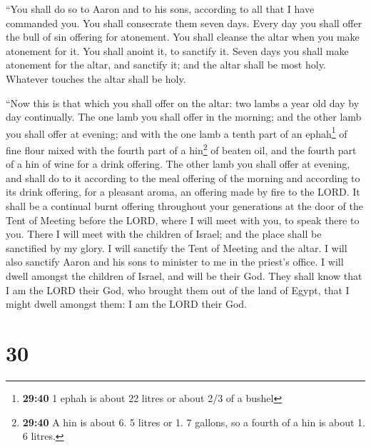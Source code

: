  ``You shall do so to Aaron and to his sons, according to
all that I have commanded you. You shall consecrate them seven days.
 Every day you shall offer the bull of sin offering for
atonement. You shall cleanse the altar when you make atonement for it.
You shall anoint it, to sanctify it.  Seven days you
shall make atonement for the altar, and sanctify it; and the altar shall
be most holy. Whatever touches the altar shall be holy.

 ``Now this is that which you shall offer on the altar:
two lambs a year old day by day continually.  The one
lamb you shall offer in the morning; and the other lamb you shall offer
at evening;  and with the one lamb a tenth part of an
ephah\footnote{\textbf{29:40} 1 ephah is about 22 litres or about 2/3 of
  a bushel} of fine flour mixed with the fourth part of a hin\footnote{\textbf{29:40}
  A hin is about 6. 5 litres or 1. 7 gallons, so a fourth of a hin is
  about 1. 6 litres.} of beaten oil, and the fourth part of a hin of
wine for a drink offering.  The other lamb you shall
offer at evening, and shall do to it according to the meal offering of
the morning and according to its drink offering, for a pleasant aroma,
an offering made by fire to the LORD.  It shall be a
continual burnt offering throughout your generations at the door of the
Tent of Meeting before the LORD, where I will meet with you, to speak
there to you.  There I will meet with the children of
Israel; and the place shall be sanctified by my glory.  I
will sanctify the Tent of Meeting and the altar. I will also sanctify
Aaron and his sons to minister to me in the priest's office.
 I will dwell amongst the children of Israel, and will be
their God.  They shall know that I am the LORD their God,
who brought them out of the land of Egypt, that I might dwell amongst
them: I am the LORD their God.

\hypertarget{section-29}{%
\section{30}\label{section-29}}

